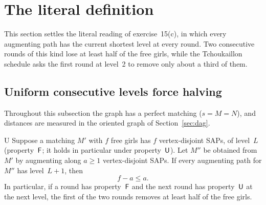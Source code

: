 \section{The literal definition}
\label{sec:literal}

This section settles the literal reading of exercise~15(c), in which
every augmenting path has the current shortest level at every round.
Two consecutive rounds of this kind lose at least half of the free
girls, while the Tchoukaillon schedule asks the first round at level~2 to
remove only about a third of them.

\subsection{Uniform consecutive levels force halving}

Throughout this subsection the graph has a perfect matching ($s=M=N$),
and distances are measured in the oriented graph of
Section~\ref{sec:dag}.

\begin{lthm}{U}
Suppose a matching $M'$ with $f$ free girls has $f$ vertex-disjoint SAPs, of
level~$L$ (property~$\mathsf F$; it holds in particular under property~$\mathsf U$).
Let $M''$ be obtained from $M'$ by augmenting along $a\ge1$
vertex-disjoint SAPs. If every augmenting path for $M''$ has level~$L+1$,
then
\[
   f-a\le a .
\]
In particular, if a round has property~$\mathsf F$ and the next round has
property~$\mathsf U$ at the next level, the first of the two rounds removes at
least half of the free girls.
\end{lthm}

